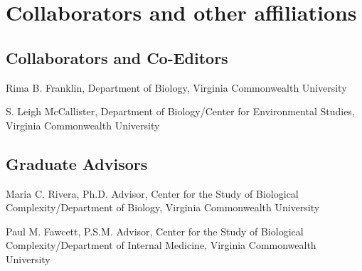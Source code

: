 \section{Collaborators and other affiliations}

\subsection*{Collaborators and Co-Editors}
\begin{packed_item}
	\item{Rima B. Franklin, Department of Biology, Virginia Commonwealth University}
	\item{S. Leigh McCallister, Department of Biology/Center for Environmental Studies, 
	Virginia Commonwealth University}		
\end{packed_item}

\subsection*{Graduate Advisors}

\begin{packed_item}
	\item{Maria C. Rivera, Ph.D. Advisor, Center for the Study of Biological Complexity/Department of Biology, 
	Virginia Commonwealth University }	
	\item{Paul M. Fawcett, P.S.M. Advisor,  Center for the Study of Biological Complexity/Department of Internal 
	Medicine, Virginia Commonwealth University}	
\end{packed_item}




